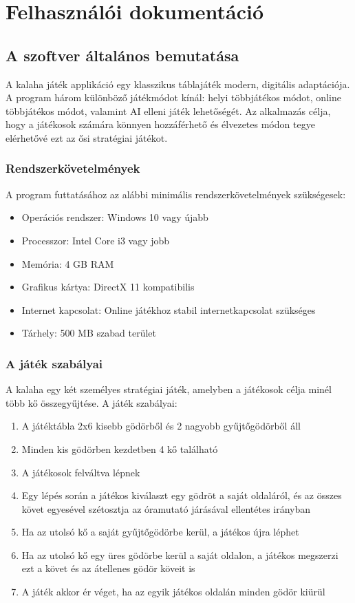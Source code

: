 \chapter{Felhasználói dokumentáció}
\label{ch:user}

\section{A szoftver általános bemutatása}

A kalaha játék applikáció egy klasszikus táblajáték modern, digitális adaptációja. A program három különböző játékmódot kínál: helyi többjátékos módot, online többjátékos módot, valamint AI elleni játék lehetőségét. Az alkalmazás célja, hogy a játékosok számára könnyen hozzáférhető és élvezetes módon tegye elérhetővé ezt az ősi stratégiai játékot.

\subsection{Rendszerkövetelmények}
A program futtatásához az alábbi minimális rendszerkövetelmények szükségesek:
\begin{itemize}
	\item Operációs rendszer: Windows 10 vagy újabb
	\item Processzor: Intel Core i3 vagy jobb
	\item Memória: 4 GB RAM
	\item Grafikus kártya: DirectX 11 kompatibilis
	\item Internet kapcsolat: Online játékhoz stabil internetkapcsolat szükséges
	\item Tárhely: 500 MB szabad terület
\end{itemize}

\subsection{A játék szabályai}
A kalaha egy két személyes stratégiai játék, amelyben a játékosok célja minél több kő összegyűjtése. A játék szabályai:

\begin{enumerate}
	\item A játéktábla 2x6 kisebb gödörből és 2 nagyobb gyűjtőgödörből áll
	\item Minden kis gödörben kezdetben 4 kő található
	\item A játékosok felváltva lépnek
	\item Egy lépés során a játékos kiválaszt egy gödröt a saját oldaláról, és az összes követ egyesével szétosztja az óramutató járásával ellentétes irányban
	\item Ha az utolsó kő a saját gyűjtőgödörbe kerül, a játékos újra léphet
	\item Ha az utolsó kő egy üres gödörbe kerül a saját oldalon, a játékos megszerzi ezt a követ és az átellenes gödör köveit is
	\item A játék akkor ér véget, ha az egyik játékos oldalán minden gödör kiürül
\end{enumerate}

